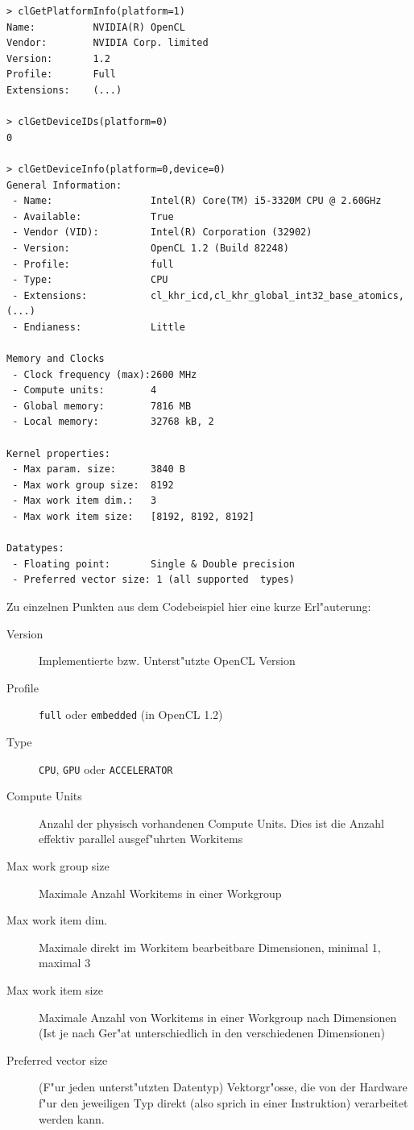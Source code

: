 \begin{refsection}
\begin{small}
\begin{verbatim}
> clGetPlatformInfo(platform=1)
Name:          NVIDIA(R) OpenCL
Vendor:        NVIDIA Corp. limited
Version:       1.2
Profile:       Full
Extensions:    (...)

> clGetDeviceIDs(platform=0)
0

> clGetDeviceInfo(platform=0,device=0)
General Information:
 - Name:                 Intel(R) Core(TM) i5-3320M CPU @ 2.60GHz
 - Available:            True
 - Vendor (VID):         Intel(R) Corporation (32902)
 - Version:              OpenCL 1.2 (Build 82248)
 - Profile:              full
 - Type:                 CPU 
 - Extensions:           cl_khr_icd,cl_khr_global_int32_base_atomics,(...)
 - Endianess:            Little

Memory and Clocks
 - Clock frequency (max):2600 MHz
 - Compute units:        4
 - Global memory:        7816 MB
 - Local memory:         32768 kB, 2

Kernel properties:
 - Max param. size:      3840 B
 - Max work group size:  8192
 - Max work item dim.:   3
 - Max work item size:   [8192, 8192, 8192]

Datatypes:
 - Floating point:       Single & Double precision
 - Preferred vector size: 1 (all supported  types)
\end{verbatim}
\end{small}

\vspace{1em}

\noindent Zu einzelnen Punkten aus dem Codebeispiel hier eine kurze Erl"auterung:


\begin{description}
 \item [Version] Implementierte bzw. Unterst"utzte OpenCL Version
 \item [Profile] \texttt{full} oder \texttt{embedded} (in OpenCL 1.2)
 \item [Type]    \texttt{CPU}, \texttt{GPU} oder \texttt{ACCELERATOR}
 \item [Compute Units] Anzahl der physisch vorhandenen Compute Units. Dies ist
                 die Anzahl effektiv parallel ausgef"uhrten Workitems
 \item [Max work group size] Maximale Anzahl Workitems in einer Workgroup
 \item [Max work item dim.] Maximale direkt im Workitem bearbeitbare Dimensionen, minimal 1, maximal 3
 \item [Max work item size] Maximale Anzahl von Workitems in einer Workgroup nach
                 Dimensionen (Ist je nach Ger"at unterschiedlich in den verschiedenen
                 Dimensionen)
 \item [Preferred vector size] (F"ur jeden unterst"utzten Datentyp) Vektorgr"osse, 
                 die von der Hardware f"ur den jeweiligen Typ direkt (also sprich in einer 
                 Instruktion) verarbeitet werden kann.
 

\end{description}
\end{refsection}
